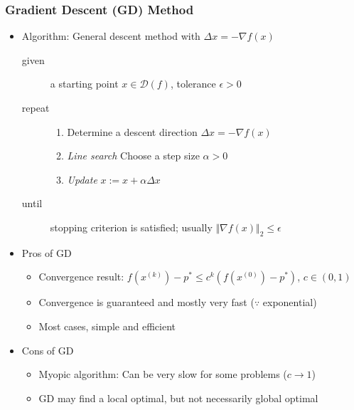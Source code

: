 \subsubsection*{Gradient Descent (GD) Method}
\begin{itemize}
    \item Algorithm: General descent method with $\Delta x = -\nabla f(x)$
    \begin{description}
        \item[given] a starting point $x\in\mathcal{D}(f)$, tolerance $\epsilon>0$
        \item[repeat] \phantom{}
        \begin{enumerate}
            \item Determine a descent direction $\Delta x=-\nabla f(x)$
            \item \textit{Line search} Choose a step size $\alpha>0$
            \item \textit{Update} $x:=x+\alpha\Delta x$
        \end{enumerate}
        \item[until] stopping criterion is satisfied; usually $\Vert\nabla f(x)\Vert_2\leq\epsilon$
    \end{description}
    \item Pros of GD
    \begin{itemize}
        \item Convergence result: $f(x^{(k)})-p^\ast\leq c^k\left(f(x^{(0)})-p^\ast\right)$, $c\in(0,1)$
        \item Convergence is guaranteed and mostly very fast ($\because$ exponential)
        \item Most cases, simple and efficient
    \end{itemize}
    \item Cons of GD
    \begin{itemize}
        \item Myopic algorithm: Can be very slow for some problems ($c\to 1$)
        \item GD may find a local optimal, but not necessarily global optimal
    \end{itemize}
\end{itemize}

